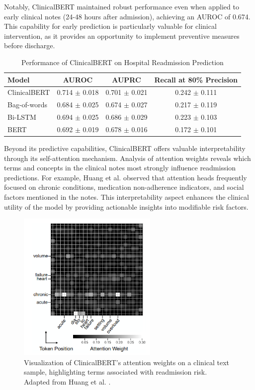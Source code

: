 \documentclass[3p,times,procedia]{elsarticle}
\begin{document}
Notably, ClinicalBERT maintained robust performance even when applied to early clinical notes (24-48 hours after admission), achieving an AUROC of 0.674. This capability for early prediction is particularly valuable for clinical intervention, as it provides an opportunity to implement preventive measures before discharge.

\begin{table}[h]
\centering
\caption{Performance of ClinicalBERT on Hospital Readmission Prediction}
\label{tab:clinicalbert_performance}
\begin{tabular}{|l|c|c|c|}
\hline
\textbf{Model} & \textbf{AUROC} & \textbf{AUPRC} & \textbf{Recall at 80\% Precision} \\ \hline
ClinicalBERT & 0.714 $\pm$ 0.018 & 0.701 $\pm$ 0.021 & 0.242 $\pm$ 0.111 \\ \hline
Bag-of-words & 0.684 $\pm$ 0.025 & 0.674 $\pm$ 0.027 & 0.217 $\pm$ 0.119 \\ \hline
Bi-LSTM & 0.694 $\pm$ 0.025 & 0.686 $\pm$ 0.029 & 0.223 $\pm$ 0.103 \\ \hline
BERT & 0.692 $\pm$ 0.019 & 0.678 $\pm$ 0.016 & 0.172 $\pm$ 0.101 \\ \hline
\end{tabular}
\end{table}

Beyond its predictive capabilities, ClinicalBERT offers valuable interpretability through its self-attention mechanism. Analysis of attention weights reveals which terms and concepts in the clinical notes most strongly influence readmission predictions. For example, Huang et al. \cite{Huang2020} observed that attention heads frequently focused on chronic conditions, medication non-adherence indicators, and social factors mentioned in the notes. This interpretability aspect enhances the clinical utility of the model by providing actionable insights into modifiable risk factors.

\begin{figure}[h]
\centering
\includegraphics[width=0.6\textwidth]{images/clinicalbert_attention.png}
\caption{Visualization of ClinicalBERT's attention weights on a clinical text sample, highlighting terms associated with readmission risk. Adapted from Huang et al. \cite{Huang2020}.}
\label{fig:clinicalbert_attention}
\end{figure}
\end{document}
